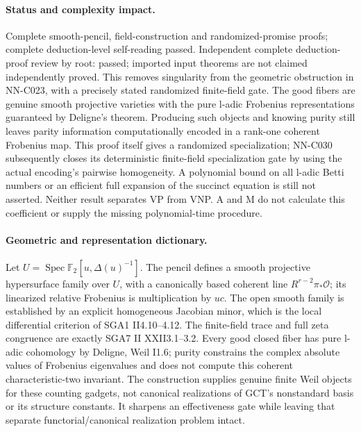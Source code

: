 \paragraph{Status and complexity impact.}
Complete smooth-pencil, field-construction and randomized-promise proofs; complete deduction-level self-reading passed. Independent complete deduction-proof review by root: passed; imported input theorems are not claimed independently proved. This removes singularity from the geometric obstruction in NN-C023, with a precisely stated randomized finite-field gate. The good fibers are genuine smooth projective varieties with the pure l-adic Frobenius representations guaranteed by Deligne's theorem. Producing such objects and knowing purity still leaves parity information computationally encoded in a rank-one coherent Frobenius map. This proof itself gives a randomized specialization; NN-C030 subsequently closes its deterministic finite-field specialization gate by using the actual encoding's pairwise homogeneity. A polynomial bound on all l-adic Betti numbers or an efficient full expansion of the succinct equation is still not asserted. Neither result separates VP from VNP. A and M do not calculate this coefficient or supply the missing polynomial-time procedure.

\paragraph{Geometric and representation dictionary.}
Let $U=\operatorname{Spec}\mathbb F_2[u,\Delta(u)^{-1}]$. The pencil defines a smooth projective hypersurface family over $U$, with a canonically based coherent line $R^{r-2}\pi_*\mathcal O$; its linearized relative Frobenius is multiplication by $uc$. The open smooth family is established by an explicit homogeneous Jacobian minor, which is the local differential criterion of SGA1 II4.10--4.12. The finite-field trace and full zeta congruence are exactly SGA7 II XXII3.1--3.2. Every good closed fiber has pure l-adic cohomology by Deligne, Weil I1.6; purity constrains the complex absolute values of Frobenius eigenvalues and does not compute this coherent characteristic-two invariant. The construction supplies genuine finite Weil objects for these counting gadgets, not canonical realizations of GCT's nonstandard basis or its structure constants. It sharpens an effectiveness gate while leaving that separate functorial/canonical realization problem intact.



